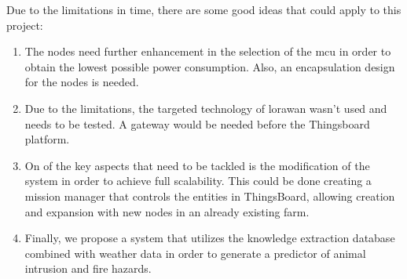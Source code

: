 Due to the limitations in time, there are some good ideas that could apply to this project:
\begin{enumerate}
    \item The nodes need further enhancement in the selection of the \acrshort{mcu} in order to obtain the lowest possible power consumption. Also, an encapsulation design 
        for the nodes is needed.
    \item Due to the limitations, the targeted technology of \acrshort{lorawan} wasn't used and needs to be tested. A gateway would be needed before the Thingsboard platform.
    \item On of the key aspects that need to be tackled is the modification of the system in order to achieve full scalability. This 
        could be done creating a mission manager that controls the entities in ThingsBoard, allowing creation and expansion with new nodes in 
        an already existing farm.
    \item Finally, we propose a system that utilizes the knowledge extraction database combined with weather data\cite{AEMETOpenDataAgencia} in order to generate a predictor of 
        animal intrusion and fire hazards.
\end{enumerate}
